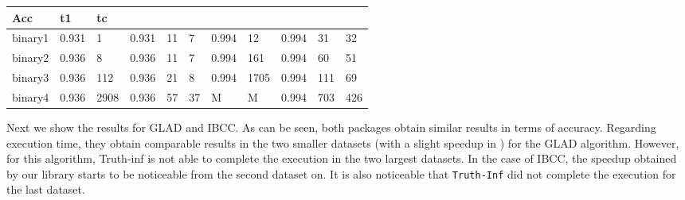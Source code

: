 \documentclass[letterpaper,10pt,english]{sphinxmanual}
\begin{document}
\begin{savenotes}
\begin{tabulary}{\linewidth}[t]{|T|T|T|T|T|T|T|T|T|T|T|}
Acc
&\sphinxstyletheadfamily 
t1
&\sphinxstyletheadfamily 
tc
\\
\hline
binary1
&
0.931
&
1
&
0.931
&
11
&
7
&
0.994
&
12
&
0.994
&
31
&
32
\\
\hline
binary2
&
0.936
&
8
&
0.936
&
11
&
7
&
0.994
&
161
&
0.994
&
60
&
51
\\
\hline
binary3
&
0.936
&
112
&
0.936
&
21
&
8
&
0.994
&
1705
&
0.994
&
111
&
69
\\
\hline
binary4
&
0.936
&
2908
&
0.936
&
57
&
37
&
M
&
M
&
0.994
&
703
&
426
\\
\hline
\end{tabulary}
\par
\sphinxattableend\end{savenotes}

Next we show the results for GLAD and IBCC. As can be seen, both packages obtain similar results
in terms of accuracy. Regarding execution time, they obtain comparable results
in the two smaller datasets (with a slight speedup in ) for the GLAD algorithm. However, for
this algorithm, Truth-inf is not able to complete the execution in the two largest datasets.
In the case of IBCC, the speedup obtained by our library starts to be noticeable from the second dataset on. It is also noticeable that 
\texttt{Truth-Inf} did not complete the execution for the last dataset. 
\end{document}
